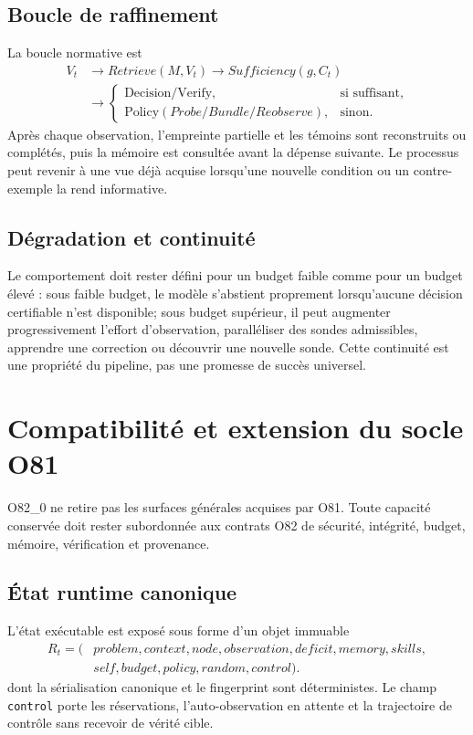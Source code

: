 \documentclass[11pt,a4paper]{report}
\begin{document}
\section{Boucle de raffinement}
La boucle normative est
\[
\begin{aligned}
V_t &\rightarrow Retrieve(M,V_t) \rightarrow Sufficiency(g,C_t)\\
&\rightarrow \begin{cases}
\text{Decision/Verify}, & \text{si suffisant},\\
\text{Policy}(Probe/Bundle/Reobserve), & \text{sinon}.
\end{cases}
\end{aligned}
\]
Après chaque observation, l'empreinte partielle et les témoins sont reconstruits ou complétés, puis la mémoire est consultée avant la dépense suivante. Le processus peut revenir à une vue déjà acquise lorsqu'une nouvelle condition ou un contre-exemple la rend informative.

\section{Dégradation et continuité}
Le comportement doit rester défini pour un budget faible comme pour un budget élevé : sous faible budget, le modèle s'abstient proprement lorsqu'aucune décision certifiable n'est disponible; sous budget supérieur, il peut augmenter progressivement l'effort d'observation, paralléliser des sondes admissibles, apprendre une correction ou découvrir une nouvelle sonde. Cette continuité est une propriété du pipeline, pas une promesse de succès universel.

\chapter{Compatibilité et extension du socle O81}
O82\_0 ne retire pas les surfaces générales acquises par O81. Toute capacité conservée doit rester subordonnée aux contrats O82 de sécurité, intégrité, budget, mémoire, vérification et provenance.

\section{État runtime canonique}
L'état exécutable est exposé sous forme d'un objet immuable
\[
\begin{aligned}
R_t=(&problem,context,node,observation,deficit,memory,skills,\\
&self,budget,policy,random,control).
\end{aligned}
\]
dont la sérialisation canonique et le fingerprint sont déterministes. Le champ \texttt{control} porte les réservations, l'auto-observation en attente et la trajectoire de contrôle sans recevoir de vérité cible.
\end{document}
